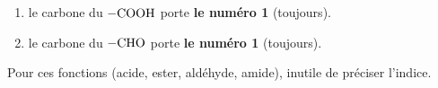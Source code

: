 \documentclass[11pt,a4paper]{article}
\begin{document}
\begin{corrige}
\begin{enumerate}[label=\alph*)]
  \item le carbone du $-\ce{COOH}$ porte \textbf{le numéro 1} (toujours).
  \item le carbone du $-\ce{CHO}$ porte \textbf{le numéro 1} (toujours).
\end{enumerate}
Pour ces fonctions (acide, ester, aldéhyde, amide), inutile de préciser l'indice.
\end{corrige}
\end{document}
